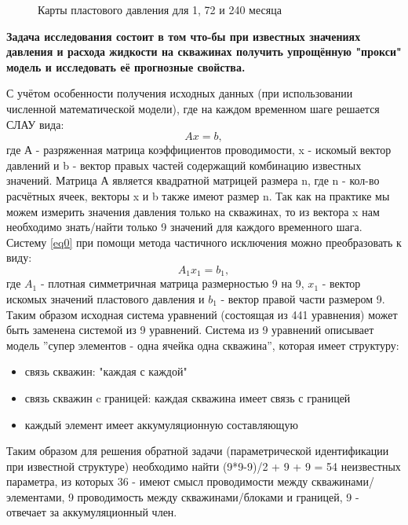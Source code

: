 \documentclass[14pt]{article}
\begin{document}
	\begin{figure}[h]
		\caption{Карты пластового давления для 1, 72 и 240 месяца}
		\label{fig:3.press_map}
	\end{figure}
	
	\textbf{Задача исследования состоит в том что-бы при известных значениях давления и расхода жидкости на скважинах получить упрощённую "прокси" модель и исследовать её прогнозные свойства.}  
	
	С учётом особенности получения исходных данных (при использовании численной математической модели), где на каждом временном шаге решается СЛАУ вида:
	\begin{equation} \label{eq0}
		Ax=b,
	\end{equation}
	где А - разряженная матрица коэффициентов проводимости, x - искомый вектор давлений и b - вектор правых частей содержащий комбинацию известных значений. Матрица А является квадратной матрицей размера n, где n - кол-во расчётных ячеек, векторы x и b также имеют размер n. Так как на практике мы можем измерить значения давления только на скважинах, то из вектора x нам необходимо знать/найти только 9 значений для каждого временного шага. Систему \ref{eq0} при помощи метода частичного исключения можно преобразовать к виду: 
	\begin{equation} \label{eq0.1}
		A_1x_1=b_1,
	\end{equation}
	где $A_1$ - плотная симметричная матрица размерностью 9 на 9, $x_1$ - вектор искомых значений пластового давления и $b_1$ - вектор правой части размером 9. Таким образом исходная система уравнений (состоящая из 441 уравнения) может быть заменена системой из 9 уравнений. Система из 9 уравнений описывает модель ''супер элементов - одна ячейка одна скважина'', которая имеет структуру:
	\begin{itemize}
		 \item связь скважин: "каждая с каждой"
		 \item связь скважин c границей: каждая скважина имеет связь с границей
		 \item каждый элемент имеет аккумуляционную составляющую
	\end{itemize}
	Таким образом для решения обратной задачи (параметрической идентификации при известной структуре) необходимо найти (9*9-9)/2 + 9 + 9 = 54 неизвестных параметра, из которых 36 - имеют смысл проводимости между скважинами/элементами, 9 проводимость между скважинами/блоками и границей, 9 - отвечает за аккумуляционный член.  
	
\end{document}

